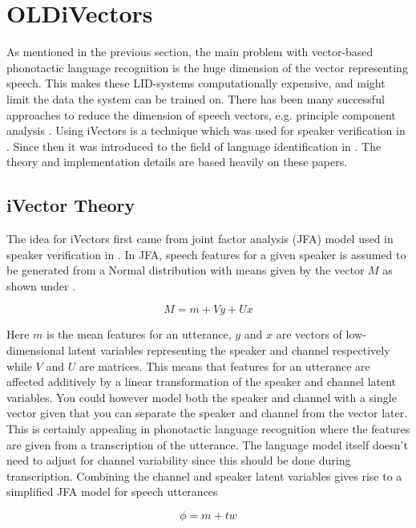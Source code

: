 \chapter{OLDiVectors}
\label{sect:iVector}
\label{chapterfive}

As mentioned in the previous section, the main problem with vector-based phonotactic language recognition is the huge dimension of the vector representing speech. This makes these LID-systems computationally expensive, and might limit the data the system can be trained on. There has been many successful approaches to reduce the dimension of speech vectors, e.g. principle component analysis \cite{pcaLID}. Using iVectors is a technique which was used for speaker verification in \cite{sviVector}. Since then it was introduced to the field of language identification in \cite{liiVector}. The theory and implementation details are based heavily on these papers.

\section{iVector Theory}
\label{theory}

The idea for iVectors first came from joint factor analysis (JFA) model used in speaker verification in \cite{oldiVector}. In JFA, speech features for a given speaker is assumed to be generated from a Normal distribution with means given by the vector $M$ as shown under \cite{oldiVector}.

\begin{equation}\label{JFA}
M=m+Vy+Ux
\end{equation}

Here $m$ is the mean features for an utterance, $y$ and $x$ are vectors of low-dimensional latent variables representing the speaker and channel respectively while $V$ and $U$ are matrices. This means that features for an utterance are affected additively by a linear transformation of the speaker and channel latent variables. You could however model both the speaker and channel with a single vector given that you can separate the speaker and channel from the vector later. This is certainly appealing in phonotactic language recognition where the features are given from a transcription of the utterance. The language model itself doesn't need to adjust for channel variability since this should be done during transcription. Combining the channel and speaker latent variables gives rise to a simplified JFA model for speech utterances

\begin{equation}\label{iVector}
\phi=m+tw
\end{equation}

